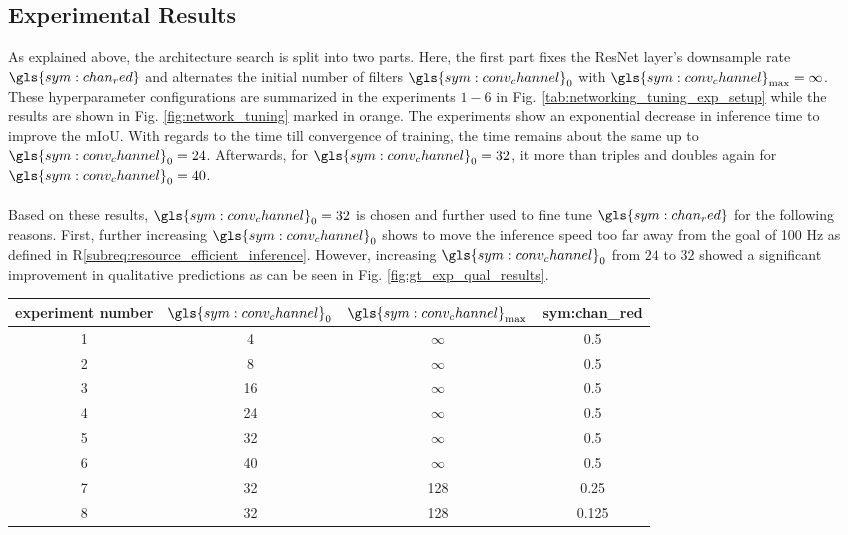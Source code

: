 \subsection{Experimental Results}
\label{subsec:exp_results_unet_arch}
As explained above, the architecture search is split into two parts. Here, the first part fixes the ResNet layer's downsample rate $\gls{sym:chan_red}$ and alternates the initial number of filters $\gls{sym:conv_channel}_0$ with $\gls{sym:conv_channel}_{\max} = \infty$. These hyperparameter configurations are summarized in the experiments $1-6$ in Fig. \ref{tab:networking_tuning_exp_setup} while the results are shown in Fig. \ref{fig:network_tuning} marked in orange. The experiments show an exponential decrease in inference time to improve the mIoU. With regards to the time till convergence of training, the time remains about the same up to $\gls{sym:conv_channel}_0 = 24$. Afterwards, for $\gls{sym:conv_channel}_0 = 32$, it more than triples and doubles again for $\gls{sym:conv_channel}_0 = 40$.
\\\\
Based on these results, $\gls{sym:conv_channel}_0 = 32$ is chosen and further used to fine tune $\gls{sym:chan_red}$ for the following reasons. First, further increasing $\gls{sym:conv_channel}_0$ shows to move the inference speed too far away from the goal of 100 Hz as defined in R\ref{subreq:resource_efficient_inference}. However, increasing $\gls{sym:conv_channel}_0$ from $24$ to $32$ showed a significant improvement in qualitative predictions as can be seen in Fig. \ref{fig:gt_exp_qual_results}.
\begin{center}
\begin{tabular}{c|c|c|c}
	experiment number & $\gls{sym:conv_channel}_0$ & $\gls{sym:conv_channel}_{\max}$ & \gls{sym:chan_red} \\
	\hline
	1 & 4 & $\infty$ & 0.5 \\
	2 & 8 & $\infty$ & 0.5 \\
	3 & 16 & $\infty$ & 0.5 \\
	4 & 24 & $\infty$ & 0.5 \\
	5 & 32 & $\infty$ & 0.5 \\
	6 & 40 & $\infty$ & 0.5 \\
	\hline
	7 & 32 & 128 & 0.25 \\
	8 & 32 & 128 & 0.125
\end{tabular}
\end{center}
